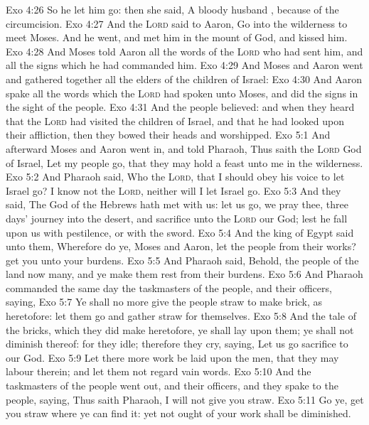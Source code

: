 \vs Exo 4:26 So he let him go: then she said, A bloody husband , because of the circumcision.
\vs Exo 4:27 And the \textsc{Lord} said to Aaron, Go into the wilderness to meet Moses. And he went, and met him in the mount of God, and kissed him.
\vs Exo 4:28 And Moses told Aaron all the words of the \textsc{Lord} who had sent him, and all the signs which he had commanded him.
\vs Exo 4:29 And Moses and Aaron went and gathered together all the elders of the children of Israel:
\vs Exo 4:30 And Aaron spake all the words which the \textsc{Lord} had spoken unto Moses, and did the signs in the sight of the people.
\vs Exo 4:31 And the people believed: and when they heard that the \textsc{Lord} had visited the children of Israel, and that he had looked upon their affliction, then they bowed their heads and worshipped.
\vs Exo 5:1 And afterward Moses and Aaron went in, and told Pharaoh, Thus saith the \textsc{Lord} God of Israel, Let my people go, that they may hold a feast unto me in the wilderness.
\vs Exo 5:2 And Pharaoh said, Who  the \textsc{Lord}, that I should obey his voice to let Israel go? I know not the \textsc{Lord}, neither will I let Israel go.
\vs Exo 5:3 And they said, The God of the Hebrews hath met with us: let us go, we pray thee, three days' journey into the desert, and sacrifice unto the \textsc{Lord} our God; lest he fall upon us with pestilence, or with the sword.
\vs Exo 5:4 And the king of Egypt said unto them, Wherefore do ye, Moses and Aaron, let the people from their works? get you unto your burdens.
\vs Exo 5:5 And Pharaoh said, Behold, the people of the land now  many, and ye make them rest from their burdens.
\vs Exo 5:6 And Pharaoh commanded the same day the taskmasters of the people, and their officers, saying,
\vs Exo 5:7 Ye shall no more give the people straw to make brick, as heretofore: let them go and gather straw for themselves.
\vs Exo 5:8 And the tale of the bricks, which they did make heretofore, ye shall lay upon them; ye shall not diminish  thereof: for they  idle; therefore they cry, saying, Let us go  sacrifice to our God.
\vs Exo 5:9 Let there more work be laid upon the men, that they may labour therein; and let them not regard vain words.
\vs Exo 5:10 And the taskmasters of the people went out, and their officers, and they spake to the people, saying, Thus saith Pharaoh, I will not give you straw.
\vs Exo 5:11 Go ye, get you straw where ye can find it: yet not ought of your work shall be diminished.
